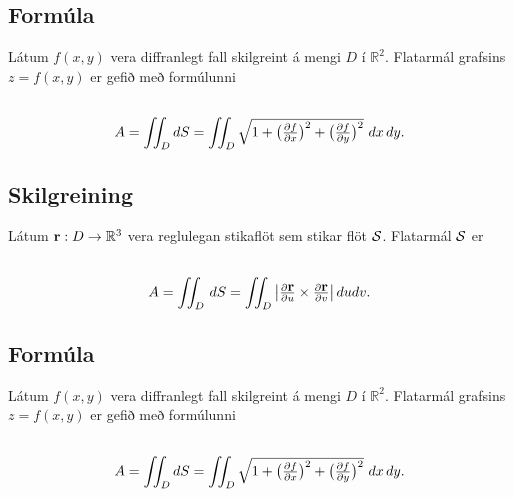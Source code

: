 \documentclass[a4paper,10pt,icelandic]{sphinxmanual}
\begin{document}
\subsection{Formúla}
\label{Kafli5:formula}
Látum \(f(x,y)\) vera diffranlegt fall skilgreint á mengi \(D\)
í \({\mathbb  R}^2\). Flatarmál grafsins \(z=f(x,y)\) er gefið
með formúlunni
\begin{gather}
\begin{split}\displaystyle\end{split}\notag\\\begin{split}A=\int\!\!\!\int_D dS=\int\!\!\!\int_D {\textstyle\sqrt{1+
\big(\frac{\partial f}{\partial x}\big)^2+
\big(\frac{\partial f}{\partial y}\big)^2}}\,\,dx\,dy.\end{split}\notag
\end{gather}

\subsection{Skilgreining}
\label{Kafli5:id20}
Látum \(\mbox{${\bf r}$}:D\rightarrow {\mathbb  R}^3\) vera
reglulegan stikaflöt sem stikar flöt \(\cal S\). Flatarmál
\(\cal S\) er
\begin{gather}
\begin{split}\displaystyle\end{split}\notag\\\begin{split}A=\int\!\!\!\int_D\,dS=\int\!\!\!\int_D \big|{\textstyle\frac{\partial \mbox{${\bf r}$}}{\partial u}
\times\frac{\partial \mbox{${\bf r}$}}{\partial v}}\big|\,dudv.\end{split}\notag
\end{gather}

\subsection{Formúla}
\label{Kafli5:id21}
Látum \(f(x,y)\) vera diffranlegt fall skilgreint á mengi \(D\)
í \({\mathbb  R}^2\). Flatarmál grafsins \(z=f(x,y)\) er gefið
með formúlunni
\begin{gather}
\begin{split}\displaystyle\end{split}\notag\\\begin{split}A=\int\!\!\!\int_D dS=\int\!\!\!\int_D {\textstyle\sqrt{1+
\big(\frac{\partial f}{\partial x}\big)^2+
\big(\frac{\partial f}{\partial y}\big)^2}}\,\,dx\,dy.\end{split}\notag
\end{gather}
\end{document}
